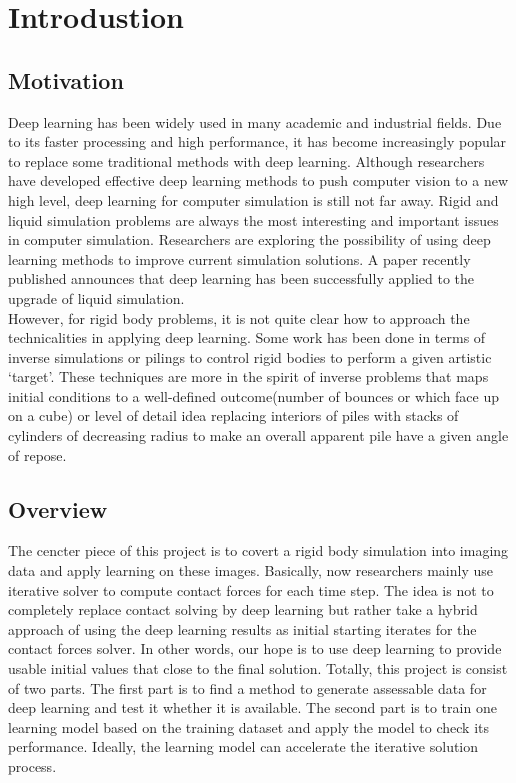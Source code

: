 \chapter{Introdustion}

\section{Motivation}

    Deep learning has been widely used in many academic and industrial fields. Due to its faster processing and high performance, it has become increasingly popular to replace some traditional methods with deep learning. Although researchers have developed effective deep learning methods to push computer vision to a new high level, deep learning for computer simulation is still not far away. Rigid and liquid simulation problems are always the most interesting and important issues in computer simulation. Researchers are exploring the possibility of using deep learning methods to improve current simulation solutions. A paper recently published announces that deep learning has been successfully applied to the upgrade of liquid simulation\cite{CNNFluid2016}. \\

    However, for rigid body problems, it is not quite clear how to approach the technicalities in applying deep learning. Some work has been done in terms of inverse simulations or pilings to control rigid bodies to perform a given artistic `target'. These techniques are more in the spirit of inverse problems that maps initial conditions to a well-defined outcome(number of bounces or which face up on a cube) or level of detail idea replacing interiors of piles with stacks of cylinders of decreasing radius to make an overall apparent pile have a given angle of repose. \\



\section{Overview}
        The cencter piece of this project is to covert a rigid body simulation into imaging data and apply learning on these images. Basically, now researchers mainly use iterative solver to compute contact forces for each time step. The idea is not to completely replace contact solving by deep learning but rather take a hybrid approach of using the deep learning results as initial starting iterates for the contact forces solver. In other words, our hope is to use deep learning to provide usable initial values that close to the final solution. Totally, this project is consist of two parts. The first part is to find a method to generate assessable data for deep learning and test it whether it is available. The second part is to train one learning model based on the training dataset and apply the model to check its performance. Ideally, the learning model can accelerate the iterative solution process. \\

